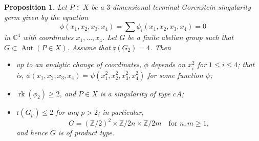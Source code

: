 \documentclass[11pt]{amsart}
\numberwithin{equation}{section}
\newtheorem{proposition}[thm]{Proposition}
\theoremstyle{definition}
\theoremstyle{remark}
\DeclareMathOperator{\Aut}{Aut}
\DeclareMathOperator{\rk}{rk}
\begin{document}
\begin{proposition}
\label{prop-action-on-gorenstein-points}
Let $P\in X$ be a $3$-dimensional terminal Gorenstein singularity germ given by the equation
\[
\phi(x_1,x_2,x_3,x_4)=\sum \phi_i(x_1,x_2,x_3,x_4)=0
\]
in $\mathbb{C}^4$ with coordinates $x_1,\ldots, x_4$. 
Let $G$ be a finite abelian group such that $G\subset \Aut(P\in X)$. 
Assume that $\mathfrak{r}(G_2)=4$.
Then
\begin{itemize} 
\item
up to an analytic change of coordinates, $\phi$ depends on $x_i^2$ for $1\leq i\leq 4$; that is, $\phi(x_1,x_2,x_3,x_4)=\psi(x_1^2,x_2^2,x_3^2,x_4^2)$ for some function $\psi$;  
\item
$\rk(\phi_2)\geq 2$, and $P\in X$ is a singularity of type $cA$;  
\item
$\mathfrak{r}(G_p)\leq 2$ for any $p>2$; in particular,  
\[
G= (\mathbb{Z}/2)^2\times\mathbb{Z}/2n\times\mathbb{Z}/2m\quad  \text{for } n,m\geq 1,
\] 
and hence $G$ is of product type.  
\end{itemize}
\end{proposition}
\end{document}
